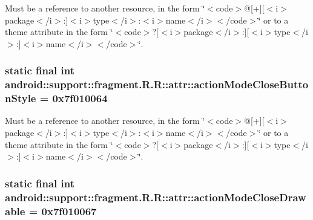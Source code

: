 Must be a reference to another resource, in the form \char`\"{}$<$code$>$@\mbox{[}+\mbox{]}\mbox{[}$<$i$>$package$<$/i$>$:\mbox{]}$<$i$>$type$<$/i$>$:$<$i$>$name$<$/i$>$$<$/code$>$\char`\"{} or to a theme attribute in the form \char`\"{}$<$code$>$?\mbox{[}$<$i$>$package$<$/i$>$:\mbox{]}\mbox{[}$<$i$>$type$<$/i$>$:\mbox{]}$<$i$>$name$<$/i$>$$<$/code$>$\char`\"{}. \hypertarget{classandroid_1_1support_1_1fragment_1_1_r_1_1attr_6dc5dbfee5c89278f0ea80ab4263864c}{
\subsubsection[{actionModeCloseButtonStyle}]{\setlength{\rightskip}{0pt plus 5cm}static final int android::support::fragment.R.R::attr::actionModeCloseButtonStyle = 0x7f010064}}
\label{classandroid_1_1support_1_1fragment_1_1_r_1_1attr_6dc5dbfee5c89278f0ea80ab4263864c}


Must be a reference to another resource, in the form \char`\"{}$<$code$>$@\mbox{[}+\mbox{]}\mbox{[}$<$i$>$package$<$/i$>$:\mbox{]}$<$i$>$type$<$/i$>$:$<$i$>$name$<$/i$>$$<$/code$>$\char`\"{} or to a theme attribute in the form \char`\"{}$<$code$>$?\mbox{[}$<$i$>$package$<$/i$>$:\mbox{]}\mbox{[}$<$i$>$type$<$/i$>$:\mbox{]}$<$i$>$name$<$/i$>$$<$/code$>$\char`\"{}. \hypertarget{classandroid_1_1support_1_1fragment_1_1_r_1_1attr_653f0dac61e61a4350fa9d05dd8eeae2}{
\subsubsection[{actionModeCloseDrawable}]{\setlength{\rightskip}{0pt plus 5cm}static final int android::support::fragment.R.R::attr::actionModeCloseDrawable = 0x7f010067}}
\label{classandroid_1_1support_1_1fragment_1_1_r_1_1attr_653f0dac61e61a4350fa9d05dd8eeae2}


